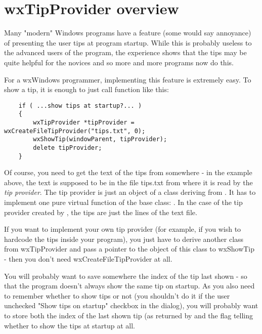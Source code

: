 \section{wxTipProvider overview}\label{tipsoverview}

Many "modern" Windows programs have a feature (some would say annoyance) of
presenting the user tips at program startup. While this is probably useless to
the advanced users of the program, the experience shows that the tips may be
quite helpful for the novices and so more and more programs now do this.

For a wxWindows programmer, implementing this feature is extremely easy. To
show a tip, it is enough to just call  function
like this:

\begin{verbatim}
    if ( ...show tips at startup?... )
    {
        wxTipProvider *tipProvider = wxCreateFileTipProvider("tips.txt", 0);
        wxShowTip(windowParent, tipProvider);
        delete tipProvider;
    }
\end{verbatim}

Of course, you need to get the text of the tips from somewhere - in the example
above, the text is supposed to be in the file tips.txt from where it is read by
the {\it tip provider}. The tip provider is just an object of a class deriving
from . It has to implement one pure
virtual function of the base class: .
In the case of the tip provider created by 
, the tips are just
the lines of the text file.

If you want to implement your own tip provider (for example, if you wish to
hardcode the tips inside your program), you just have to derive another class
from wxTipProvider and pass a pointer to the object of this class to wxShowTip
- then you don't need wxCreateFileTipProvider at all.

You will probably want to save somewhere the index of the tip last
shown - so that the program doesn't always show the same tip on startup. As you
also need to remember whether to show tips or not (you shouldn't do it if the
user unchecked "Show tips on startup" checkbox in the dialog), you will
probably want to store both the index of the
last shown tip (as returned by 
 and the flag
telling whether to show the tips at startup at all.

